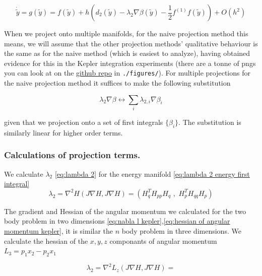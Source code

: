 \documentclass[12pt]{article}
\begin{document}
\begin{equation}\label{eq:modified equation for general projection method first few terms}
    \dot{\widetilde{y}} = g(\widetilde{y}) = f(\widetilde y) + h\left( d_2(\widetilde y) - \lambda_2\nabla\beta(\widetilde y) - \frac{1}{2}f^{(1)}f(\widetilde y) \right) + O(h^2)
\end{equation}

When we project onto multiple manifolds, for the naive projection method this means, we will assume that the other projection methods' qualitative behaviour is the same as for the naive method (which is easiest to analyze), having obtained evidence for this in the Kepler integration experiments (there are a tonne of pngs you can look at on the \href{https://github.com/dcxSt/numerical_integrators}{github repo} in \texttt{./figures/}). For multiple projections for the naive projection method it suffices to make the following substitution 

$$\lambda_2\nabla\beta \longleftrightarrow \sum_i \lambda_{2,i}\nabla\beta_i$$

given that we projection onto a set of first integrals $\{\beta_i\}$. The substitution is similarly linear for higher order terms. 


\subsubsection{Calculations of projection terms.}

We calculate $\lambda_2$ \eqref{eq:lambda 2} for the energy manifold \eqref{eq:lambda 2 energy first integral}
\begin{equation}\label{eq:lambda 2 energy first integral}
    \lambda_2 = \nabla^2H \left( J\nabla H , J\nabla H \right) = \left( H_q^TH_{pp}H_q \,\,,\,\, H_p^TH_{qq}H_p \right)
\end{equation}

The gradient and Hessian of the angular momentum we calculated for the two body problem in two dimensions \eqref{eq:nabla l kepler},\eqref{eq:hessian of angular momentum kepler}, it is similar the $n$ body problem in three dimensions. We calculate the hessian of the $x,y,z$ componants of angular momentum $L_3 = p_1x_2 - p_2x_1$ 

\begin{equation}\label{eq:lambda 2 angular momentum first integral}
    \lambda_2 = \nabla^2L_z \left( J\nabla H , J\nabla H \right) = 
\end{equation}
\end{document}
